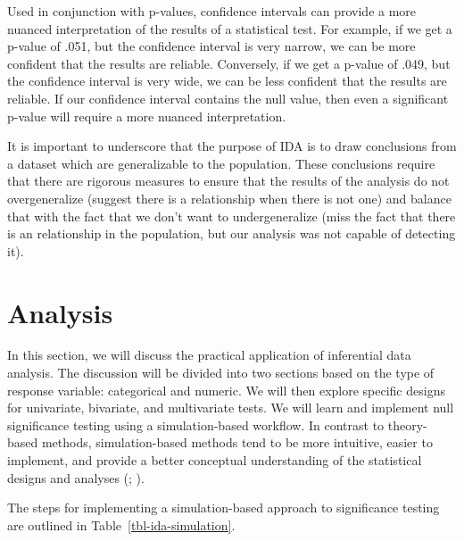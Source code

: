\documentclass[
  letterpaper,
]{latex/krantz}
\theoremstyle{definition}
\theoremstyle{remark}
\begin{document}
Used in conjunction with p-values, confidence intervals can provide a
more nuanced interpretation of the results of a statistical test. For
example, if we get a p-value of .051, but the confidence interval is
very narrow, we can be more confident that the results are reliable.
Conversely, if we get a p-value of .049, but the confidence interval is
very wide, we can be less confident that the results are reliable. If
our confidence interval contains the null value, then even a significant
p-value will require a more nuanced interpretation.

It is important to underscore that the purpose of IDA is to draw
conclusions from a dataset which are generalizable to the population.
These conclusions require that there are rigorous measures to ensure
that the results of the analysis do not overgeneralize (suggest there is
a relationship when there is not one) and balance that with the fact
that we don't want to undergeneralize (miss the fact that there is an
relationship in the population, but our analysis was not capable of
detecting it).

\section{Analysis}\label{sec-ida-analysis}

In this section, we will discuss the practical application of
inferential data analysis. The discussion will be divided into two
sections based on the type of response variable: categorical and
numeric. We will then explore specific designs for univariate,
bivariate, and multivariate tests. We will learn and implement null
significance testing using a simulation-based workflow. In contrast to
theory-based methods, simulation-based methods tend to be more
intuitive, easier to implement, and provide a better conceptual
understanding of the statistical designs and analyses
(;
).

The steps for implementing a simulation-based approach to significance
testing are outlined in Table~\ref{tbl-ida-simulation}.
\end{document}
